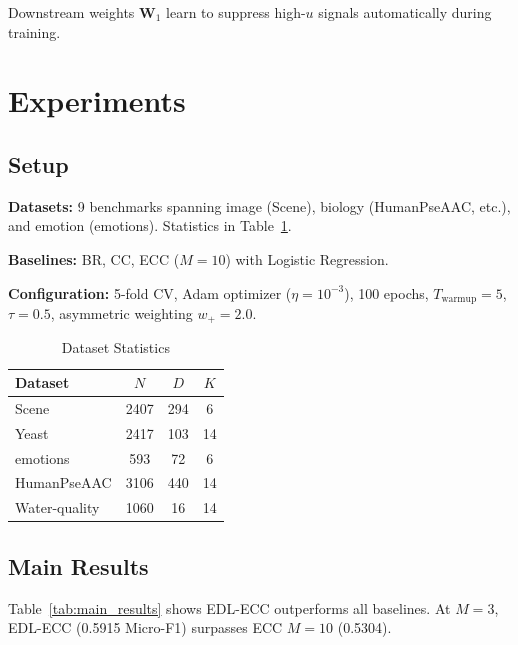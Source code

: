\documentclass[conference]{IEEEtran}
\begin{document}
Downstream weights $\mathbf{W}_1$ learn to suppress high-$u$ signals automatically during training.

\section{Experiments}

\subsection{Setup}

\textbf{Datasets:} 9 benchmarks spanning image (Scene), biology (HumanPseAAC, etc.), and emotion (emotions). Statistics in Table~\ref{tab:datasets}.

\textbf{Baselines:} BR, CC, ECC ($M=10$) with Logistic Regression.

\textbf{Configuration:} 5-fold CV, Adam optimizer ($\eta=10^{-3}$), 100 epochs, $T_{\mathrm{warmup}}=5$, $\tau=0.5$, asymmetric weighting $w_+ = 2.0$.

\begin{table}[t]
\centering
\caption{Dataset Statistics}
\label{tab:datasets}
\small
\begin{tabular}{lccc}
\toprule
\textbf{Dataset} & \textbf{$N$} & \textbf{$D$} & \textbf{$K$} \\
\midrule
Scene & 2407 & 294 & 6 \\
Yeast & 2417 & 103 & 14 \\
emotions & 593 & 72 & 6 \\
HumanPseAAC & 3106 & 440 & 14 \\
Water-quality & 1060 & 16 & 14 \\
\bottomrule
\end{tabular}
\end{table}

\subsection{Main Results}

Table~\ref{tab:main_results} shows EDL-ECC outperforms all baselines. At $M=3$, EDL-ECC (0.5915 Micro-F1) surpasses ECC $M=10$ (0.5304).
\end{document}
